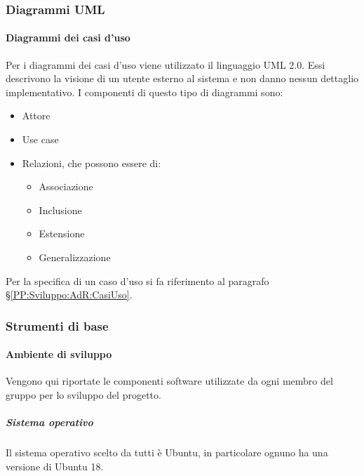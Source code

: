 		\subsubsection{Diagrammi UML}\label{PP:Sviluppo:UML}	%
		
		
		\paragraph{Diagrammi dei casi d'uso}	\label{DiagrammiCasiUso}
		Per i diagrammi dei casi d'uso viene utilizzato il linguaggio UML 2.0. Essi descrivono la visione di un utente esterno al sistema e non danno nessun dettaglio implementativo. I componenti di questo tipo di diagrammi sono:
		\begin{itemize}
			\item Attore
			\item Use case
			\item Relazioni, che possono essere di:
			\begin{itemize}
				\item Associazione
				\item Inclusione
				\item Estensione
				\item Generalizzazione
			\end{itemize}
		\end{itemize}
		Per la specifica di un caso d'uso si fa riferimento al paragrafo \S\ref{PP:Sviluppo:AdR:CasiUso}.
		
		

        
        \subsubsection{Strumenti di base}\label{PP:Sviluppo:Strumenti}
        
	    \paragraph{Ambiente di sviluppo}\label{PP:Sviluppo:Strumenti:AmbienteSviluppo}
	    Vengono qui riportate le componenti software utilizzate da ogni membro del gruppo per lo sviluppo del progetto.
	         	
	        	
	    \subparagraph{Sistema operativo}\label{PP:Sviluppo:Strumenti:AmbienteSviluppo:SistemaOperativo}
	    Il sistema operativo scelto da tutti è Ubuntu, in particolare ognuno ha una versione di Ubuntu 18. 
	        		
        
		
		
	